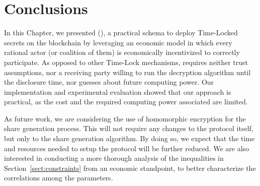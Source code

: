 \section{Conclusions}\label{sect:conclusions}

In this Chapter, we presented \name (\shortname), a practical schema to deploy Time-Locked secrets on the blockchain by leveraging an economic model in which every rational actor (or coalition of them) is economically incentivized to correctly participate.
As opposed to other Time-Lock mechanisms, \shortname requires neither trust assumptions, nor a receiving party willing to run the decryption algorithm until the disclosure time, nor guesses about future computing power.
Our implementation and experimental evaluation showed that our approach is practical, as the cost and the required computing power associated are limited.

As future work, we are considering the use of homomorphic encryption for the share generation process. This will not require any changes to the protocol itself, but only to the share generation algorithm. By doing so, we expect that the time and resources needed to setup the protocol will be further reduced.
We are also interested in conducting a more thorough analysis of the inequalities in Section~\ref{sect:constraints} from an economic standpoint, to better characterize the correlations among the parameters.

